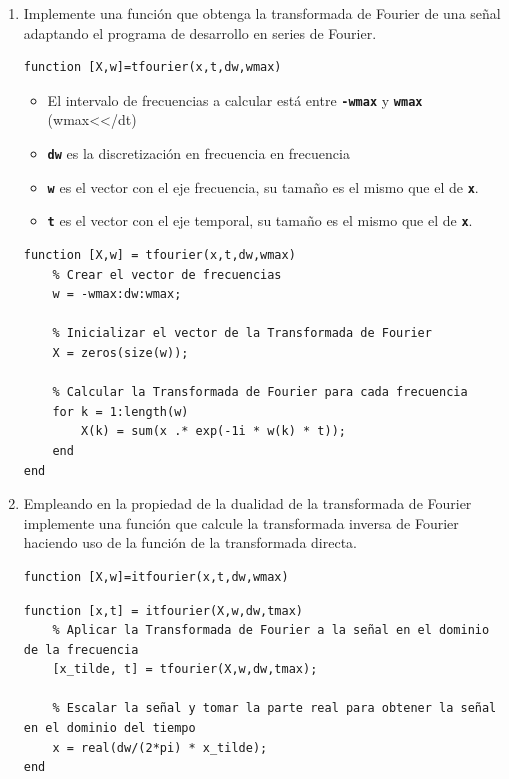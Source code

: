 \documentclass{article}
\newcommand{\code}[1]{\texttt{\textbf{#1}}}
\begin{document}
\begin{enumerate}[leftmargin=*]
\begin{enumerate}[label=\roman*)]
\end{enumerate}
\item Implemente una función que obtenga la transformada de Fourier de una señal adaptando el programa de desarrollo en series de Fourier.
\begin{lstlisting}
function [X,w]=tfourier(x,t,dw,wmax)
\end{lstlisting}
\begin{itemize}[label=$-$]
\item El intervalo de frecuencias a calcular está entre \code{-wmax} y \code{wmax} (wmax\textless\textless\textpi/dt)
\item \code{dw} es la discretización en frecuencia en frecuencia
\item \code{w} es el vector con el eje frecuencia, su tamaño es el mismo que el de \code{x}.
\item \code{t} es el vector con el eje temporal, su tamaño es el mismo que el de \code{x}.
\end{itemize}
\begin{lstlisting}
function [X,w] = tfourier(x,t,dw,wmax)
    % Crear el vector de frecuencias
    w = -wmax:dw:wmax;

    % Inicializar el vector de la Transformada de Fourier
    X = zeros(size(w));

    % Calcular la Transformada de Fourier para cada frecuencia
    for k = 1:length(w)
        X(k) = sum(x .* exp(-1i * w(k) * t));
    end
end
\end{lstlisting}
\item Empleando en la propiedad de la dualidad de la transformada de Fourier implemente una función que calcule la transformada inversa de Fourier haciendo uso de la función de la transformada directa.
\begin{lstlisting}
function [X,w]=itfourier(x,t,dw,wmax)
\end{lstlisting}

\begin{lstlisting}
function [x,t] = itfourier(X,w,dw,tmax)
    % Aplicar la Transformada de Fourier a la señal en el dominio de la frecuencia
    [x_tilde, t] = tfourier(X,w,dw,tmax);

    % Escalar la señal y tomar la parte real para obtener la señal en el dominio del tiempo
    x = real(dw/(2*pi) * x_tilde);
end
\end{lstlisting}


\end{enumerate}
\end{document}
